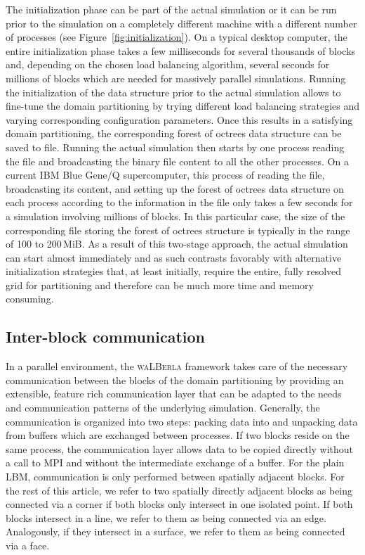\documentclass[final,leqno,onefignum,onetabnum]{siamltex1213}
\newcommand{\Walberla}{\textsc{waLBerla}}
\begin{document}
The initialization phase can be part of the actual simulation or it can be run prior to the simulation
on a completely different machine with a different number of processes (see Figure~\ref{fig:initialization}).
On a typical desktop computer, the entire initialization phase takes a few milliseconds for several thousands of blocks and,
depending on the chosen load balancing algorithm, several seconds for millions of blocks which are needed for massively parallel simulations.
Running the initialization of the data structure prior to the actual simulation allows
to fine-tune the domain partitioning by trying different load balancing strategies and varying corresponding configuration parameters.
Once this results in a satisfying domain partitioning, the corresponding forest of octrees data structure can be saved to file.
Running the actual simulation then starts by one process reading the file and broadcasting the binary file content to all the other processes.
On a current IBM Blue Gene/Q supercomputer, this process of reading the file, broadcasting its content,
and setting up the forest of octrees data structure on each process according to the information in the file only takes a few seconds
for a simulation involving millions of blocks.
In this particular case, the size of the corresponding file storing the forest of octrees structure is typically in the range of 100 to 200\,MiB.
As a result of this two-stage approach, the actual simulation can start almost immediately and as such contrasts favorably with alternative initialization strategies that, at least initially, require the entire, fully resolved grid for partitioning and therefore can be much more time and memory consuming.

\subsection{Inter-block communication}\label{sec:pconcept:communication}

In a parallel environment, the \Walberla{} framework takes care of the necessary communication between the blocks of the domain partitioning
by providing an extensible, feature rich communication layer that can be adapted to the needs and communication patterns of the underlying simulation.
Generally, the communication is organized into two steps: packing data into and unpacking data from buffers which are exchanged between processes.
If two blocks reside on the same process, the communication layer allows data to be copied directly
without a call to MPI and without the intermediate exchange of a buffer.
For the plain LBM, communication is only performed between spatially adjacent blocks.
For the rest of this article, we refer to two spatially directly adjacent blocks as being connected via a corner if both blocks only intersect in one isolated point.
If both blocks intersect in a line, we refer to them as being connected via an edge.
Analogously, if they intersect in a surface, we refer to them as being connected via a face.
\end{document}
